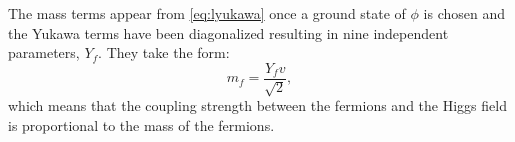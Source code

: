 
The mass terms appear from \cref{eq:lyukawa} once a ground state of $\phi$ is chosen and the Yukawa terms have been diagonalized resulting in nine independent parameters, $Y_f$. 
They take the form:
\begin{equation}
  m_f = \frac{Y_f v}{\sqrt{2}},
\end{equation}
which means that the coupling strength between the fermions and the Higgs field is proportional to the mass of the fermions.


